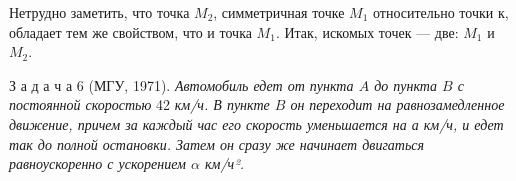 \begin{multicols}{2}
	Нетрудно заметить, что точка \(M_2\), симметричная точке \(M_1\) относительно точки к, обладает тем же свойством, что и точка \(M_1\). Итак, искомых точек --- две: \(M_1\) и \(M_2\).
	
	З а д а ч а 6 (МГУ, 1971). \textit{Автомобиль едет от пункта \(A\) до пункта \(B\) с постоянной скоростью} 42\textit{ км/ч. В пункте \(B\) он переходит на равнозамедленное движение, причем за каждый час его скорость уменьшается на а км/ч, и едет так до полной остановки. Затем он сразу же начинает двигаться равноускоренно с ускорением \(\alpha\) км/ч².}
\end{multicols}%